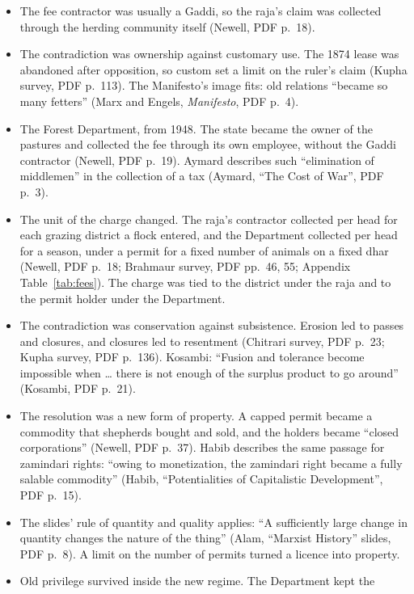 \documentclass[11pt,a4paper]{article}
\newcommand{\cit}[1]{{\small(#1)}}
\newcommand{\Habib}{Habib, \enquote{Potentialities of Capitalistic Development}}
\begin{document}
\begin{itemize}
\item The fee contractor was usually a Gaddi, so the raja's claim was collected
  through the herding community itself \cit{Newell, PDF p.~18}.
\item The contradiction was ownership against customary use. The 1874 lease was
  abandoned after opposition, so custom set a limit on the ruler's claim
  \cit{Kupha survey, PDF p.~113}. The Manifesto's image fits: old relations
  \enquote{became so many fetters} \cit{Marx and Engels, \emph{Manifesto},
  PDF p.~4}.
\item The Forest Department, from 1948. The state became the owner of the
  pastures and collected the fee through its own employee, without the Gaddi
  contractor \cit{Newell, PDF p.~19}. Aymard describes such \enquote{elimination
  of middlemen} in the collection of a tax \cit{Aymard, \enquote{The Cost of
  War}, PDF p.~3}.
\item The unit of the charge changed. The raja's contractor collected per head
  for each grazing district a flock entered, and the Department collected per
  head for a season, under a permit for a fixed number of animals on a fixed
  dhar \cit{Newell, PDF p.~18; Brahmaur survey, PDF pp.~46, 55; Appendix
  Table~\ref{tab:fees}}. The charge was tied to the district under the raja and
  to the permit holder under the Department.
\item The contradiction was conservation against subsistence. Erosion led to
  passes and closures, and closures led to resentment \cit{Chitrari survey,
  PDF p.~23; Kupha survey, PDF p.~136}. Kosambi: \enquote{Fusion and tolerance
  become impossible when \dots{} there is not enough of the surplus product to
  go around} \cit{Kosambi, PDF p.~21}.
\item The resolution was a new form of property. A capped permit became
  a commodity that shepherds bought and sold, and the holders became \enquote{closed
  corporations} \cit{Newell, PDF p.~37}. Habib describes the same passage for
  zamindari rights: \enquote{owing to monetization, the zamindari right became a
  fully salable commodity} \cit{\Habib, PDF p.~15}.
\item The slides' rule of quantity and quality applies: \enquote{A sufficiently
  large change in quantity changes the nature of the thing} \cit{Alam,
  \enquote{Marxist History} slides, PDF p.~8}. A limit on the number of permits
  turned a licence into property.
\item Old privilege survived inside the new regime. The Department kept the

\end{itemize}
\end{document}
